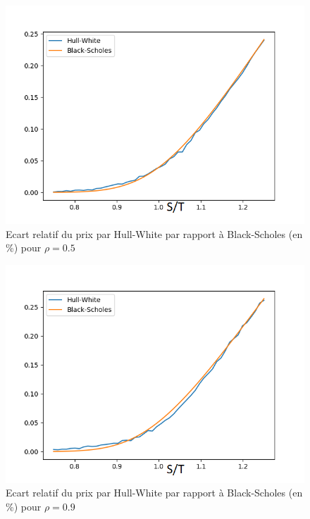 \documentclass{report}
\begin{document}
\begin{figure}[H]
\begin{center}
\includegraphics[scale=0.7]{hwrho_0,5.png}
\end{center}
\caption{Ecart relatif du prix par Hull-White par rapport à Black-Scholes (en \%) pour $\rho = 0.5$}
\end{figure}

\begin{figure}[H]
\begin{center}
\includegraphics[scale=0.7]{hwrho_0,9.png}
\end{center}
\caption{Ecart relatif du prix par Hull-White par rapport à Black-Scholes (en \%) pour $\rho = 0.9$}
\end{figure} 
\end{document}
